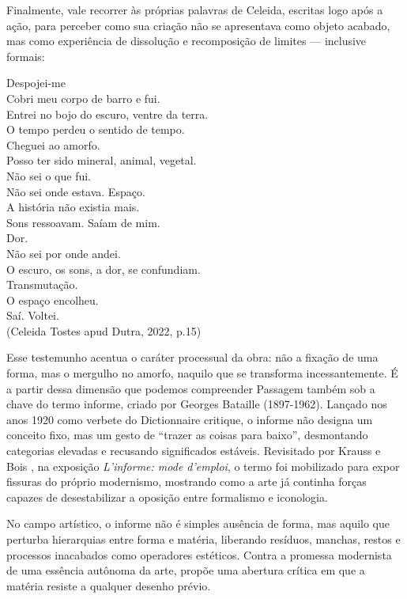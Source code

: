 Finalmente, vale recorrer às próprias palavras de Celeida, escritas logo após a ação, para perceber como sua criação não se apresentava como objeto acabado, mas como experiência de dissolução e recomposição de limites — inclusive formais:

\begin{citacao}
  Despojei-me\\
  Cobri meu corpo de barro e fui.\\
  Entrei no bojo do escuro, ventre da terra.\\
  O tempo perdeu o sentido de tempo.\\
  Cheguei ao amorfo.\\
  Posso ter sido mineral, animal, vegetal.\\
  Não sei o que fui.\\
  Não sei onde estava. Espaço.\\
  A história não existia mais.\\
  Sons ressoavam. Saíam de mim.\\
  Dor.\\
  Não sei por onde andei.\\
  O escuro, os sons, a dor, se confundiam.\\
  Transmutação.\\
  O espaço encolheu.\\
  Saí. Voltei.\\
  (Celeida Tostes apud Dutra, 2022, p.15)
\end{citacao}

Esse testemunho acentua o caráter processual da obra: não a fixação de uma forma, mas o mergulho no amorfo, naquilo que se transforma incessantemente. É a partir dessa dimensão que podemos compreender Passagem também sob a chave do termo informe, criado por Georges Bataille (1897-1962). Lançado nos anos 1920 como verbete do Dictionnaire critique, o informe não designa um conceito fixo, mas um gesto de “trazer as coisas para baixo”, desmontando categorias elevadas e recusando significados estáveis. Revisitado por Krauss e Bois \citeyear{boisFormlessUsersGuide1997}, na exposição \emph{L’informe: mode d’emploi}, o termo foi mobilizado para expor fissuras do próprio modernismo, mostrando como a arte já continha forças capazes de desestabilizar a oposição entre formalismo e iconologia.

No campo artístico, o informe não é simples ausência de forma, mas aquilo que perturba hierarquias entre forma e matéria, liberando resíduos, manchas, restos e processos inacabados como operadores estéticos. Contra a promessa modernista de uma essência autônoma da arte, propõe uma abertura crítica em que a matéria resiste a qualquer desenho prévio.

